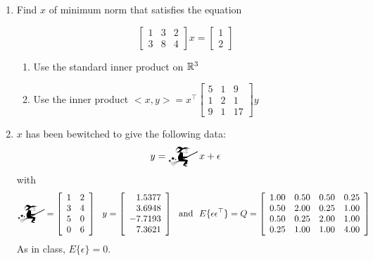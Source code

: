 \documentclass[letterpaper]{article}
\begin{document}
\begin{enumerate}
\begin{enumerate}
\item Find the range of $a$ such that the following matrix is positive definite:
$\mathghost= \left[ \begin{array}{rrr}  1&   2&   6\\  2&   5&   7\\  6&   7&  a\end{array}\right]$


\end{enumerate}

\item Find $x$ of minimum norm that satisfies the equation

$$ \left[ \begin{array}{rrr}  1&   3 & 2\\  3&   8 & 4 \end{array} \right] x = \left[ \begin{array}{r}  1 \\2\end{array} \right]$$

        \begin{enumerate}
\setlength{\itemsep}{.1in}
\renewcommand{\labelenumi}{(\alph{enumi})}

\item  Use the standard inner product on $\mathbb R^3$

\item  Use the inner product $<x,y>= x^\top \left[ \begin{array}{rrr}  5&   1&   9\\  1&   2&   1\\  9&   1&  17\end{array} \right]y$

\end{enumerate}

\item $x$ has been bewitched to give the following data:
$$ y = \mathwitch x + \epsilon$$
with
$$ \mathwitch=\left[\begin{array}{rr}  1&   2\\  3&   4\\  5&   0\\  0&   6\end{array} \right] ~~ y=\left[  \begin{array}{r}1.5377\\3.6948\\-7.7193\\7.3621\end{array}\right] ~~\mbox{and}  ~~ E\{ \epsilon \epsilon^\top \} = Q=\left[ \begin{array}{rrrr}1.00& 0.50& 0.50& 0.25\\0.50& 2.00& 0.25& 1.00\\0.50& 0.25& 2.00& 1.00\\0.25& 1.00& 1.00& 4.00\end{array}
\right] $$
As in class, $E\{ \epsilon\} = 0$.



\end{enumerate}
\end{document}
